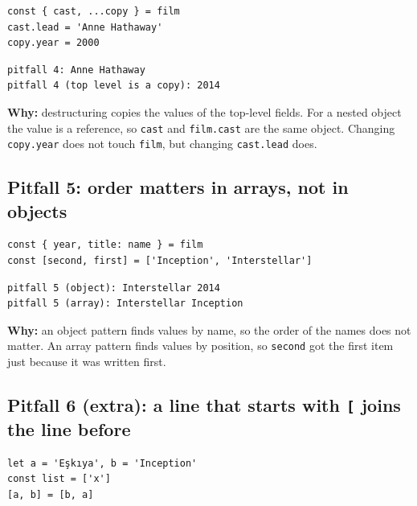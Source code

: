 \documentclass[
]{article}
\newcommand{\passthrough}[1]{#1}
\begin{document}
\begin{lstlisting}
const { cast, ...copy } = film
cast.lead = 'Anne Hathaway'
copy.year = 2000
\end{lstlisting}

\begin{lstlisting}
pitfall 4: Anne Hathaway
pitfall 4 (top level is a copy): 2014
\end{lstlisting}

\textbf{Why:} destructuring copies the values of the top-level fields.
For a nested object the value is a reference, so
\passthrough{\lstinline!cast!} and \passthrough{\lstinline!film.cast!}
are the same object. Changing \passthrough{\lstinline!copy.year!} does
not touch \passthrough{\lstinline!film!}, but changing
\passthrough{\lstinline!cast.lead!} does.

\hypertarget{pitfall-5-order-matters-in-arrays-not-in-objects}{%
\subsection{Pitfall 5: order matters in arrays, not in
objects}\label{pitfall-5-order-matters-in-arrays-not-in-objects}}

\begin{lstlisting}
const { year, title: name } = film
const [second, first] = ['Inception', 'Interstellar']
\end{lstlisting}

\begin{lstlisting}
pitfall 5 (object): Interstellar 2014
pitfall 5 (array): Interstellar Inception
\end{lstlisting}

\textbf{Why:} an object pattern finds values by name, so the order of
the names does not matter. An array pattern finds values by position, so
\passthrough{\lstinline!second!} got the first item just because it was
written first.

\hypertarget{pitfall-6-extra-a-line-that-starts-with-joins-the-line-before}{%
\subsection{\texorpdfstring{Pitfall 6 (extra): a line that starts with
\texttt{{[}} joins the line
before}{Pitfall 6 (extra): a line that starts with {[} joins the line before}}\label{pitfall-6-extra-a-line-that-starts-with-joins-the-line-before}}

\begin{lstlisting}
let a = 'Eşkıya', b = 'Inception'
const list = ['x']
[a, b] = [b, a]
\end{lstlisting}
\end{document}
